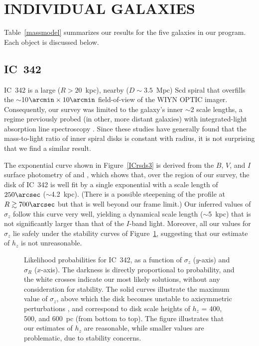 \documentclass[12pt,preprint]{emulateapj}
\newcommand{\eg}{{e.g.,}}
\begin{document}
\section{INDIVIDUAL GALAXIES}

Table~\ref{massmodel} summarizes our results for the five galaxies in our program.  Each object is discussed below.

\subsection{IC~342}
IC~342 is a large ($R > 20$~kpc), nearby ($D \sim 3.5$~Mpc) Scd spiral that overfills the $\sim$10$\arcmin \times 10\arcmin$ field-of-view of the WIYN OPTIC imager.  Consequently, our survey was limited to the galaxy's inner $\sim$2 scale lengths, a regime previously probed (in other, more distant galaxies) with integrated-light absorption line spectroscopy \citep[\eg][]{b93, g+97, g+00}.  Since these studies have generally found that the mass-to-light ratio of inner spiral disks is constant with radius, it is not surprising that we find a similar result.  

The exponential curve shown in Figure~\ref{ICrsds3} is derived from the $B$, $V$, and $I$ surface photometry of \citet{bm99} and \citet{wb03}, which shows that, over the region of our survey, the disk of IC~342 is well fit by a single exponential with a scale length of $250\arcsec$ ($\sim$4.2~kpc).  (There is a possible steepening of the profile at $R \gtrsim 700\arcsec$ but that is well beyond our frame limit.)   Our inferred values of $\sigma_z$ follow this curve very well, yielding a dynamical scale length ($\sim$5~kpc) that is not significantly larger than that of the $I$-band light.  Moreover, all our values for $\sigma_z$ lie safely under the \citet{t64} stability curves of Figure~\ref{ICcon}, suggesting that our estimate of $h_z$ is not unreasonable.

\begin{figure}
\caption{\scriptsize Likelihood probabilities for IC~342, as a function of $\sigma_z$ ($y$-axis) and $\sigma_R$ ($x$-axis).  The darkness is directly proportional to probability, and the white crosses indicate our most likely solutions, without any consideration for stability.  The solid curves illustrate the maximum value of $\sigma_z$, above which the disk becomes unstable to axisymmetric perturbations \citep{t64}, and correspond to disk scale heights of $h_z$ = 400, 500, and 600~pc (from bottom to top). The figure illustrates that our estimates of $h_z$ are reasonable, while smaller values are problematic, due to stability concerns.  \label{ICcon} }
\end{figure}
\end{document}
